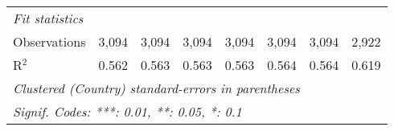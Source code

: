 \begin{tabular}{lccccccc}
   \midrule \emph{Fit statistics}\\
   Observations                                                            & 3,094        & 3,094        & 3,094        & 3,094        & 3,094        & 3,094        & 2,922\\  
   R$^2$                                                                   & 0.562        & 0.563        & 0.563        & 0.563        & 0.564        & 0.564        & 0.619\\  
   \midrule
   \multicolumn{8}{l}{\emph{Clustered (Country) standard-errors in parentheses}}\\
   \multicolumn{8}{l}{\emph{Signif. Codes: ***: 0.01, **: 0.05, *: 0.1}}\\
\end{tabular}
\par\endgroup


